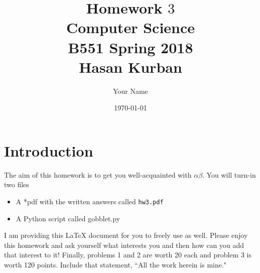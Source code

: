 \documentclass{article}
\begin{document}
\title{Homework $3$\\ Computer Science \\ B551 Spring 2018\\ Hasan Kurban}         %
\author{Your Name}        %
\date{\today}          %
\maketitle

      
\makeatother     %




\pagestyle{plain}
\section*{Introduction}
The aim of this homework is to get you well-acquainted with $\alpha\beta$. You will turn-in two files \begin{itemize} \item A *pdf with the written answers called \texttt{hw3.pdf} \item  A Python script called gobblet.py\end{itemize}  I am providing this \LaTeX{} document for you to freely use as well. Please enjoy this homework and ask yourself what interests you and then how can you add that interest to it!  Finally, problems 1 and 2 are worth 20 each and problem 3 is worth 120 points. Include that
statement, ``All the work herein is mine."

\newpage
\end{document}
